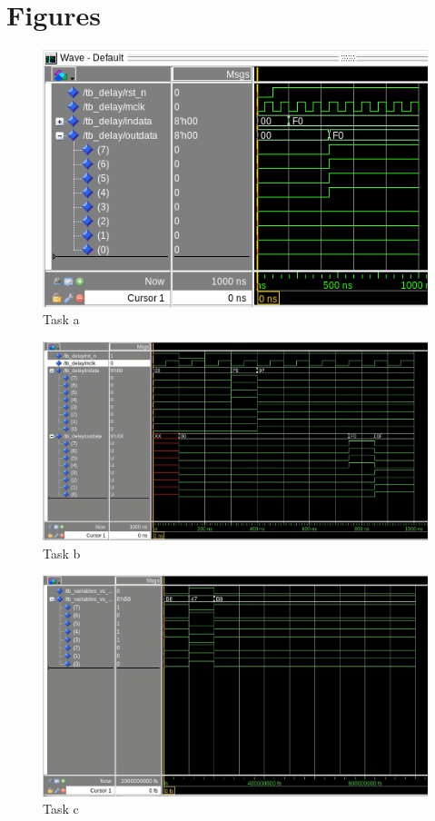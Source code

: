     \section*{Figures}
        \begin{figure}[!ht]
            \centering
            \includegraphics[width = \textwidth]{figur1.png}
            \caption{Task a}
            \label{fig:figure1}
        \end{figure}
        \begin{figure}[!ht]
            \centering
            \includegraphics[width = \textwidth]{figur2.png}
            \caption{Task b}
            \label{fig:figure2}
        \end{figure} 
        \begin{figure}[!ht]
            \centering
            \includegraphics[width = \textwidth]{figur3.png}
            \caption{Task c}
            \label{fig:figure3}
        \end{figure}
